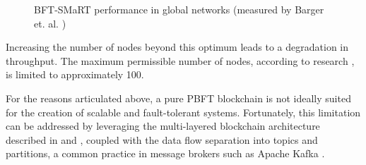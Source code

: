\documentclass[10pt]{llncs}
\begin{document}
\begin{figure}
    \centering
    \caption{BFT-SMaRT performance in global networks (measured by Barger et. al. \cite{barger2021byzantine})}
    \label{fig:smartbft-global}
\end{figure}

Increasing the number of nodes beyond this optimum leads to a degradation in throughput. 
The maximum permissible number of nodes, according to research \cite{Ke2023}, is limited to approximately 100.

For the reasons articulated above, a pure PBFT blockchain is not ideally suited for the creation of scalable and fault-tolerant systems. 
Fortunately, this limitation can be addressed by leveraging the multi-layered blockchain architecture described in \cite{Bogdanov2024} and \cite{Lin2023}, 
coupled with the data flow separation into topics and partitions, a common practice in message brokers such as Apache Kafka \cite{apachekafka}.
\end{document}
